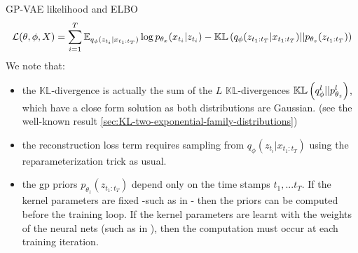 \begin{frame}{GP-VAE likelihood and ELBO}
    \begin{align}
    \mathcal{L}(\theta, \phi, X) = \sum_{i=1}^T \mathbb{E}_{q_{\phi}(z_{t_i} \vert x_{t_1:t_T})} \log{p_{\theta_x}(x_{t_i} \vert z_{t_i})} - \mathbb{KL}\left( q_{\phi}(z_{t_1:t_T} \vert x_{t_1:t_T}) \vert\vert p_{\theta_z}(z_{t_1:t_T}) \right)
\end{align}
We note that:
\begin{itemize}
    \item the $\mathbb{KL}$-divergence is actually the sum of the $L$ $\mathbb{KL}$-divergences $\mathbb{KL}\left( q_{\phi}^l \vert\vert p_{\theta_z}^l \right)$, which have a close form solution as both distributions are Gaussian. (see the well-known result \ref{sec:KL-two-exponential-family-distributions})
    \item the reconstruction loss term requires sampling from $q_{\phi}(z_{t_i} \vert x_{t_1:t_T})$ using the reparameterization trick as usual.
    \item the \gls{gp} priors $p_{\theta_z}(z_{t_1:t_T})$ depend only on the time stamps $t_1,...t_T$. If the kernel parameters are fixed -such as in \cite{fortuin_gp-vae:_2020}- then the priors can be computed before the training loop. If the kernel parameters are learnt with the weights of the neural nets (such as in \cite{zhu_markovian_2023}), then the computation must occur at each training iteration.
\end{itemize}
\end{frame}


